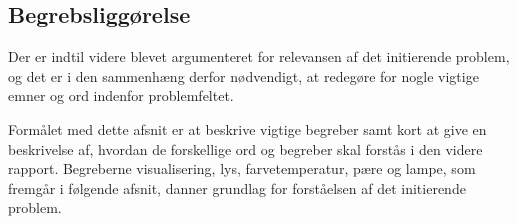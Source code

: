 \subsection{Begrebsliggørelse}
Der er indtil videre blevet  argumenteret for relevansen af det initierende problem, og det er i den sammenhæng derfor nødvendigt, at redegøre for nogle vigtige emner og ord indenfor problemfeltet. 

Formålet med dette afsnit er at beskrive vigtige begreber samt kort at give en beskrivelse af, hvordan de forskellige ord og begreber skal forstås i den videre rapport. Begreberne visualisering, lys, farvetemperatur, pære og lampe, som fremgår i følgende afsnit, danner grundlag for forståelsen af det initierende problem. 




 


